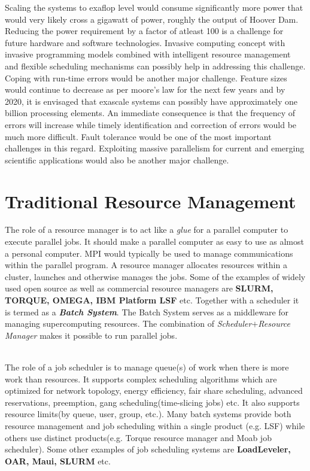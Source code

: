 Scaling the systems to exaflop level would consume significantly more power that would very likely cross a gigawatt of power, roughly the output of Hoover Dam. Reducing the power requirement by a factor of atleast 100 is a challenge for future hardware and software technologies. Invasive computing concept with invasive programming models combined with intelligent resource management and flexible scheduling mechanisms can possibly help in addressing this challenge.
Coping with run-time errors would be another major challenge. Feature sizes would continue to decrease as per moore's law for the next few years and by 2020, it is envisaged that exascale systems can possibly have approximately one billion processing elements. An immediate consequence is that the frequency of errors will increase while timely identification and correction of errors would be much more difficult. Fault tolerance would be one of the most important challenges in this regard.
Exploiting massive parallelism for current and emerging scientific applications would also be another major challenge.
\section{Traditional Resource Management}
The role of a resource manager is to act like a \textit{glue} for a parallel computer to execute parallel jobs. It should make a parallel computer as easy to use as almost a personal computer. MPI would typically be used to manage communications within the parallel program. A resource manager allocates resources within a cluster, launches and otherwise manages the jobs. Some of the examples of widely used open source as well as commercial resource managers are \textbf{SLURM, TORQUE, OMEGA, IBM Platform LSF} etc. Together with a scheduler it is termed as a \textbf{\textit{Batch System}}. The Batch System serves as a middleware for managing supercomputing resources. The combination of \textit{Scheduler}$+$\textit{Resource Manager} makes it possible to run parallel jobs.\par
\noindent
\\
The role of a job scheduler is to manage queue(s) of work when there is more work than resources. It supports complex scheduling algorithms which are optimized for network topology, energy efficiency, fair share scheduling, advanced reservations, preemption, gang scheduling(time-slicing jobs) etc. It also supports resource limits(by queue, user, group, etc.). Many batch systems provide both resource management and job scheduling within a single product (e.g. LSF) while others use distinct products(e.g. Torque resource manager and Moab job scheduler). Some other examples of job scheduling systems are \textbf{LoadLeveler, OAR, Maui, SLURM} etc.
